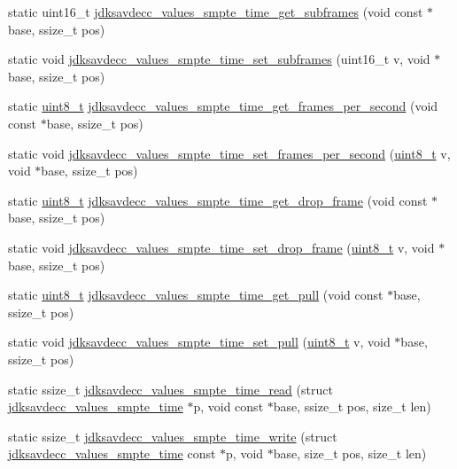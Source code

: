 \begin{DoxyCompactItemize}
static uint16\+\_\+t \hyperlink{group__values__smpte__time_ga8448f1d4356bb0e771975fd163f6ef81}{jdksavdecc\+\_\+values\+\_\+smpte\+\_\+time\+\_\+get\+\_\+subframes} (void const $\ast$base, ssize\+\_\+t pos)
\item 
static void \hyperlink{group__values__smpte__time_gad39c0f512e6fab29e4f9097b02a2b550}{jdksavdecc\+\_\+values\+\_\+smpte\+\_\+time\+\_\+set\+\_\+subframes} (uint16\+\_\+t v, void $\ast$base, ssize\+\_\+t pos)
\item 
static \hyperlink{stdint_8h_aba7bc1797add20fe3efdf37ced1182c5}{uint8\+\_\+t} \hyperlink{group__values__smpte__time_ga551e3edf0737b4d69f05211661c2532c}{jdksavdecc\+\_\+values\+\_\+smpte\+\_\+time\+\_\+get\+\_\+frames\+\_\+per\+\_\+second} (void const $\ast$base, ssize\+\_\+t pos)
\item 
static void \hyperlink{group__values__smpte__time_ga6825a8ea3f44e1075798d3143f09259e}{jdksavdecc\+\_\+values\+\_\+smpte\+\_\+time\+\_\+set\+\_\+frames\+\_\+per\+\_\+second} (\hyperlink{stdint_8h_aba7bc1797add20fe3efdf37ced1182c5}{uint8\+\_\+t} v, void $\ast$base, ssize\+\_\+t pos)
\item 
static \hyperlink{stdint_8h_aba7bc1797add20fe3efdf37ced1182c5}{uint8\+\_\+t} \hyperlink{group__values__smpte__time_ga4a7ccd1f7309a15e314f8bc428ce5aa5}{jdksavdecc\+\_\+values\+\_\+smpte\+\_\+time\+\_\+get\+\_\+drop\+\_\+frame} (void const $\ast$base, ssize\+\_\+t pos)
\item 
static void \hyperlink{group__values__smpte__time_ga8bfb6a85ec5b376406dadef0ae08d5bd}{jdksavdecc\+\_\+values\+\_\+smpte\+\_\+time\+\_\+set\+\_\+drop\+\_\+frame} (\hyperlink{stdint_8h_aba7bc1797add20fe3efdf37ced1182c5}{uint8\+\_\+t} v, void $\ast$base, ssize\+\_\+t pos)
\item 
static \hyperlink{stdint_8h_aba7bc1797add20fe3efdf37ced1182c5}{uint8\+\_\+t} \hyperlink{group__values__smpte__time_ga178d6c008a67cfc49e748b4d0ad63c20}{jdksavdecc\+\_\+values\+\_\+smpte\+\_\+time\+\_\+get\+\_\+pull} (void const $\ast$base, ssize\+\_\+t pos)
\item 
static void \hyperlink{group__values__smpte__time_ga1e043d9c7b57f14e800a926e9a516f34}{jdksavdecc\+\_\+values\+\_\+smpte\+\_\+time\+\_\+set\+\_\+pull} (\hyperlink{stdint_8h_aba7bc1797add20fe3efdf37ced1182c5}{uint8\+\_\+t} v, void $\ast$base, ssize\+\_\+t pos)
\item 
static ssize\+\_\+t \hyperlink{group__values__smpte__time_ga5eed212ad9c391d95b345084506cd747}{jdksavdecc\+\_\+values\+\_\+smpte\+\_\+time\+\_\+read} (struct \hyperlink{structjdksavdecc__values__smpte__time}{jdksavdecc\+\_\+values\+\_\+smpte\+\_\+time} $\ast$p, void const $\ast$base, ssize\+\_\+t pos, size\+\_\+t len)
\item 
static ssize\+\_\+t \hyperlink{group__values__smpte__time_gae9dd6a95d19fe06811b02b4f19ef41aa}{jdksavdecc\+\_\+values\+\_\+smpte\+\_\+time\+\_\+write} (struct \hyperlink{structjdksavdecc__values__smpte__time}{jdksavdecc\+\_\+values\+\_\+smpte\+\_\+time} const $\ast$p, void $\ast$base, size\+\_\+t pos, size\+\_\+t len)
\end{DoxyCompactItemize}


